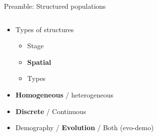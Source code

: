 \documentclass[aspectratio=169]{beamer}
\begin{document}
\begin{frame}{Preamble: Structured populations}

\begin{columns}
\begin{column}{0.6\textwidth} 

\begin{itemize}
\item<2-> Types of structures
\begin{itemize}
\item Stage
\item \textbf<6>{Spatial}
\item Types
\end{itemize}
\item<3-> \textbf<6>{Homogeneous} / heterogeneous
\item<4-> \textbf<6>{Discrete} / Continuous
\item<5-> Demography / \textbf<6>{Evolution} / Both (evo-demo)
\end{itemize}
\end{column}
%
%
\begin{column}{0.37\textwidth} 
\begin{center}
\def \wpic {4cm}
\def \sca {1}



\end{center}

\end{column}
\end{columns}

\end{frame}
\end{document}
